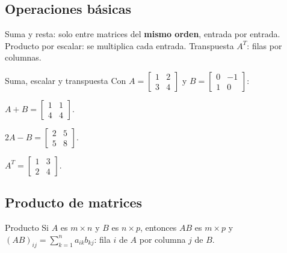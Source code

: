 \subsection{Operaciones b\'asicas}
Suma y resta: solo entre matrices del \textbf{mismo orden}, entrada por entrada. Producto por escalar: se multiplica cada entrada. Transpuesta $A^T$: filas por columnas.

\begin{tmejemplo}{Suma, escalar y transpuesta}
Con $A=\begin{bmatrix}1&2\\3&4\end{bmatrix}$ y $B=\begin{bmatrix}0&-1\\1&0\end{bmatrix}$:
\begin{tmpasos}
\item $A+B=\begin{bmatrix}1&1\\4&4\end{bmatrix}$.
\item $2A-B=\begin{bmatrix}2&5\\5&8\end{bmatrix}$.
\item $A^T=\begin{bmatrix}1&3\\2&4\end{bmatrix}$.
\end{tmpasos}
\end{tmejemplo}

\subsection{Producto de matrices}
\begin{tmdef}{Producto}
Si $A$ es $m\times n$ y $B$ es $n\times p$, entonces $AB$ es $m\times p$ y $(AB)_{ij}=\sum_{k=1}^{n}a_{ik}b_{kj}$: fila $i$ de $A$ por columna $j$ de $B$.
\end{tmdef}

\begin{center}
\end{center}

